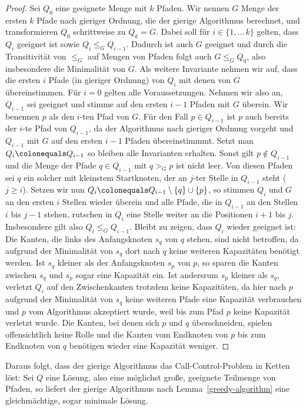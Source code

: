    \begin{proof}
       Sei $Q_0$ eine geeignete Menge mit $k$ Pfaden.
       Wir nennen $G$ Menge der ersten $k$ Pfade nach gieriger Ordnung, die der gierige Algorithmus berechnet, und
       transformieren $Q_0$ schrittweise zu $Q_k = G$.
       Dabei soll für $i \in \{1,\dots\,k\}$ gelten, dass $Q_i$ geeignet ist sowie $Q_i \leq_G Q_{i-1}$.
       Dadurch ist auch $G$ geeignet und durch die Transitivität von $\leq_G$ auf Mengen von Pfaden folgt auch
       $G \leq_G Q_0$, also insbesondere die Minimalität von $G$.
       Als weitere Invariante nehmen wir auf, dass die ersten $i$ Pfade (in gieriger Ordnung) von $Q_i$ mit denen von
       $G$ übereinstimmen.
       Für $i=0$ gelten alle Voraussetzungen.
       Nehmen wir also an, $Q_{i-1}$ sei geeignet und stimme auf den ersten $i-1$ Pfaden mit $G$ überein.
       Wir benennen $p$ als den $i$-ten Pfad von $G$.
       Für den Fall $p \in Q_{i-1}$ ist $p$ auch bereits der $i$-te Pfad von $Q_{i-1}$, da der Algorithmus nach
       gieriger Ordnung vorgeht und $Q_{i-1}$ mit $G$ auf den ersten $i-1$ Pfaden übereinstimmmt.
       Setzt man $Q_i \colonequals Q_{i-1}$ so bleiben alle Invarianten erhalten.
       Sonst gilt $p \notin Q_{i-1}$ und die Menge der Pfade $q \in Q_{i-1}$ mit $q >_G p$ ist nicht leer.
       Von diesen Pfaden sei $q$ ein solcher mit kleinstem Startknoten, der an $j$-ter Stelle in $Q_{i-1}$ steht
       ($j \geq i$).
       Setzen wir nun $Q_{i} \colonequals Q_{i-1} \setminus \{ q \} \cup \{ p \}$, so stimmen $Q_{i}$ und $G$ an den
       ersten $i$ Stellen wieder überein und alle Pfade, die in $Q_{i-1}$ an den Stellen $i$ bis $j-1$ stehen, rutschen
       in $Q_i$ eine Stelle weiter an die Positionen $i+1$ bis $j$.
       Insbesondere gilt also $Q_i \leq_G Q_{i-1}$.
       Bleibt zu zeigen, dass $Q_i$ wieder geeignet ist:
       Die Kanten, die links des Anfangsknoten $s_q$ von $q$ stehen, sind nicht betroffen, da aufgrund der Minimalität
       von $s_q$ dort nach $q$ keine weiteren Kapazitäten benötigt werden.
       Ist $s_q$ kleiner als der Anfangsknoten $s_p$ von $p$, so sparen die Kanten zwischen $s_q$ und $s_p$ sogar eine
       Kapazität ein.
       Ist andersrum $s_p$ kleiner als $s_q$, verletzt $Q_i$ auf den Zwischenkanten trotzdem keine Kapazitäten, da
       hier nach $p$ aufgrund der Minimalität von $s_q$ keine weiteren Pfade eine Kapazität verbrauchen und $p$ vom
       Algorithmus akzeptiert wurde, weil bis zum Pfad $p$ keine Kapazität verletzt wurde.
       Die Kanten, bei denen sich $p$ und $q$ überschneiden, spielen offensichtlich keine Rolle und die Kanten
       vom Endknoten von $p$ bis zum Endknoten von $q$ benötigen wieder eine Kapazität weniger.
   \end{proof}
Daraus folgt, dass der gierige Algorithmus das Call-Control-Problem in Ketten löst:
Sei $Q$ eine Lösung, also eine möglichst große, geeignete Teilmenge von Pfaden, so liefert der gierige Algorithmus nach
Lemma~\ref{greedy-algorithm} eine gleichmächtige, sogar minimale Lösung.
